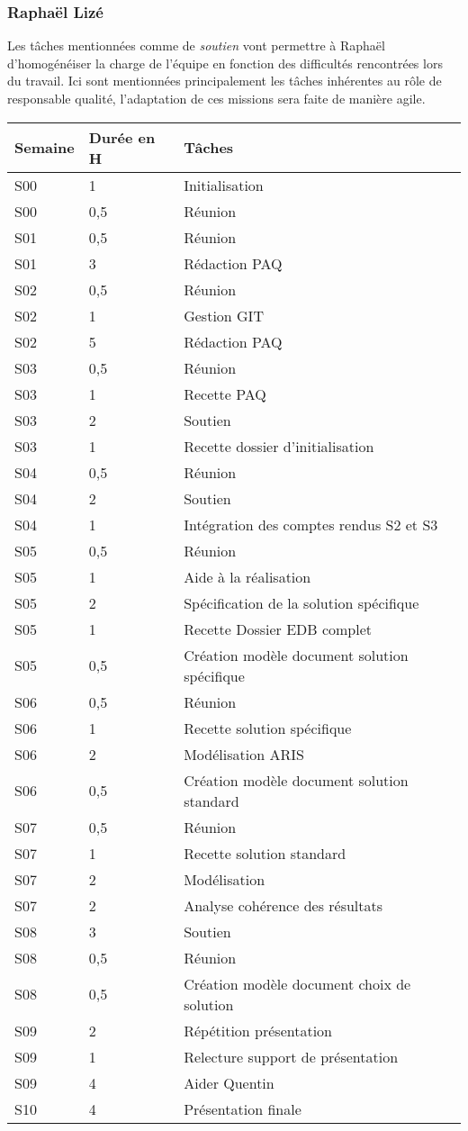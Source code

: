 \documentclass[twoside]{article}
\begin{document}
\pagebreak
\subsubsection{Raphaël Lizé}

Les tâches mentionnées comme de \textsl{soutien} vont permettre à Raphaël d'homogénéiser
la charge de l'équipe en fonction des difficultés rencontrées lors du travail. 
Ici sont mentionnées principalement les tâches inhérentes au rôle de responsable qualité,
l'adaptation de ces missions sera faite de manière agile.

\begin{longtable}{|l|l|l|}
\hline
Semaine&Durée en H&Tâches\\
\hline
S00&1&Initialisation\\
\hline
S00&0,5&Réunion\\
\hline
S01&0,5&Réunion\\
\hline
S01&3&Rédaction PAQ\\
\hline
S02&0,5&Réunion\\
\hline
S02&1&Gestion GIT\\
\hline
S02&5&Rédaction PAQ\\
\hline
S03&0,5&Réunion\\
\hline
S03&1&Recette PAQ\\
\hline
S03&2&Soutien\\
\hline
S03&1&Recette dossier d'initialisation\\
\hline
S04&0,5&Réunion\\
\hline
S04&2&Soutien\\
\hline
S04&1&Intégration des comptes rendus S2 et S3\\
\hline
S05&0,5&Réunion\\
\hline
S05&1&Aide à la réalisation\\
\hline
S05&2&Spécification de la solution spécifique\\
\hline
S05&1&Recette Dossier EDB complet\\
\hline
S05&0,5&Création modèle document solution spécifique\\
\hline
S06&0,5&Réunion\\
\hline
S06&1&Recette solution spécifique\\
\hline
S06&2&Modélisation ARIS\\
\hline
S06&0,5&Création modèle document solution standard\\
\hline
S07&0,5&Réunion\\
\hline
S07&1&Recette solution standard\\
\hline
S07&2&Modélisation\\
\hline
S07&2&Analyse cohérence des résultats\\
\hline
S08&3&Soutien\\
\hline
S08&0,5&Réunion\\
\hline
S08&0,5&Création modèle document choix de solution\\
\hline
S09&2&Répétition présentation\\
\hline
S09&1&Relecture support de présentation\\
\hline
S09&4&Aider Quentin\\
\hline
S10&4&Présentation finale\\
\hline
\end{longtable}
\end{document}

